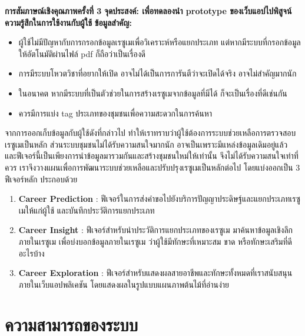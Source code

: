 \noindent\textbf{การสัมภาษณ์เชิงคุณภาพครั้งที่ 3}
\newline
\textbf{จุดประสงค์: เพื่อทดลองนำ prototype ของเว็บแอปไปพิสูจน์ความรู้สึกในการใช้งานกับผู้ใช้}
\newline
\textbf{ข้อมูลสำคัญ:}
\begin{itemize}
    \item ผู้ใช้ไม่มีปัญหากับการกรอกข้อมูลเรซูเมเพื่อวิเคราะห์หรือแยกประเภท แต่หากมีระบบที่กรอกข้อมูลให้อัตโนมัติผ่านไฟล์ pdf ก็ถือว่าเป็นเรื่องดี
    \item การมีระบบโหวตวิชาที่อยากให้เปิด อาจไม่ได้เป็นการการันตีว่าจะเปิดได้จริง อาจไม่สำคัญมากนัก
    \item ในอนาคต หากมีระบบที่เป็นตัวช่วยในการสร้างเรซูเมจากข้อมูลที่มีได้ ก็จะเป็นเรื่องที่ดีเช่นกัน
    \item ควรมีการแบ่ง tag ประเภทของชุมชนเพื่อความสะดวกในการค้นหา
\end{itemize}

จากการออกเก็บข้อมูลกับผู้ใช้ดังที่กล่าวไป ทำให้เราทราบว่าผู้ใช้ต้องการระบบช่วยเหลือการตรวจสอบเรซูเมเป็นหลัก ส่วนระบบชุมชนไม่ได้รับความสนใจมากนัก 
อาจเป็นเพราะมีแหล่งข้อมูลเดิมอยู่แล้ว และฟีเจอร์นี้เป็นเพียงการนำข้อมูลมารวมกันและสร้างชุมชนใหม่ให้เท่านั้น จึงไม่ได้รับความสนใจเท่าที่ควร 
เราจึงวางแผนเพื่อการพัฒนาระบบช่วยเหลือและปรับปรุงเรซูเมเป็นหลักต่อไป โดยแบ่งออกเป็น 3 ฟีเจอร์หลัก ประกอบด้วย
\begin{enumerate}
    \item  \textbf{Career Prediction} \label{subsec:Career Prediction} : ฟีเจอร์ในการส่งคำขอไปยังบริการปัญญาประดิษฐ์และแยกประเภทเรซูเมให้แก่ผู้ใช้ และบันทึกประวัติการแยกประเภท
    \item  \textbf{Career Insight} \label{subsec:Career Insight} : ฟีเจอร์สำหรับนำประวัติการแยกประเภทของเรซูเม มาค้นหาข้อมูลเชิงลึกภายในเรซูเม เพื่อบ่งบอกข้อมูลภายในเรซูเม ว่าผู้ใช้มีทักษะที่เหมาะสม ขาด หรือทักษะเสริมที่ดีอะไรบ้าง
    \item  \textbf{Career Exploration} \label{subsec:Career Exploration} : ฟีเจอร์สำหรับแสดงผลสายอาชีพและทักษะทั้งหมดที่เราสนับสนุนภายในเว็บแอปพลิเคชัน โดยแสดงผลในรูปแบบแผนภาพต้นไม้ที่อ่านง่าย
\end{enumerate}


\section{ความสามารถของระบบ}
